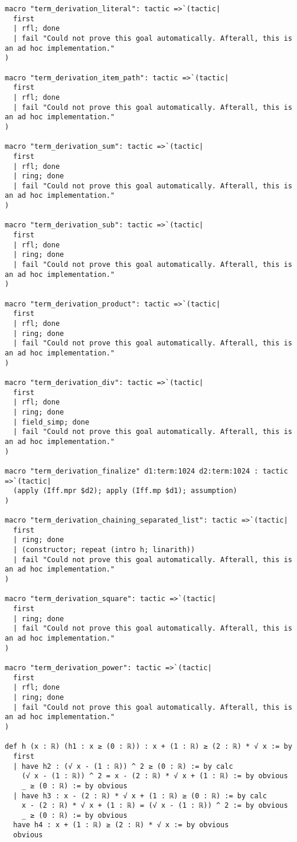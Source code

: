 \documentclass{article}
\begin{document}
\begin{tcolorbox}[colback=white!10, width=\linewidth]
\begin{lstlisting}[language=Lean4]
macro "term_derivation_literal": tactic =>`(tactic|
  first
  | rfl; done
  | fail "Could not prove this goal automatically. Afterall, this is an ad hoc implementation."
)

macro "term_derivation_item_path": tactic =>`(tactic|
  first
  | rfl; done
  | fail "Could not prove this goal automatically. Afterall, this is an ad hoc implementation."
)

macro "term_derivation_sum": tactic =>`(tactic|
  first
  | rfl; done
  | ring; done
  | fail "Could not prove this goal automatically. Afterall, this is an ad hoc implementation."
)

macro "term_derivation_sub": tactic =>`(tactic|
  first
  | rfl; done
  | ring; done
  | fail "Could not prove this goal automatically. Afterall, this is an ad hoc implementation."
)

macro "term_derivation_product": tactic =>`(tactic|
  first
  | rfl; done
  | ring; done
  | fail "Could not prove this goal automatically. Afterall, this is an ad hoc implementation."
)

macro "term_derivation_div": tactic =>`(tactic|
  first
  | rfl; done
  | ring; done
  | field_simp; done
  | fail "Could not prove this goal automatically. Afterall, this is an ad hoc implementation."
)

macro "term_derivation_finalize" d1:term:1024 d2:term:1024 : tactic =>`(tactic|
  (apply (Iff.mpr $d2); apply (Iff.mp $d1); assumption)
)

macro "term_derivation_chaining_separated_list": tactic =>`(tactic|
  first
  | ring; done
  | (constructor; repeat (intro h; linarith))
  | fail "Could not prove this goal automatically. Afterall, this is an ad hoc implementation."
)

macro "term_derivation_square": tactic =>`(tactic|
  first
  | ring; done
  | fail "Could not prove this goal automatically. Afterall, this is an ad hoc implementation."
)

macro "term_derivation_power": tactic =>`(tactic|
  first
  | rfl; done
  | ring; done
  | fail "Could not prove this goal automatically. Afterall, this is an ad hoc implementation."
)

def h (x : ℝ) (h1 : x ≥ (0 : ℝ)) : x + (1 : ℝ) ≥ (2 : ℝ) * √ x := by
  first
  | have h2 : (√ x - (1 : ℝ)) ^ 2 ≥ (0 : ℝ) := by calc
    (√ x - (1 : ℝ)) ^ 2 = x - (2 : ℝ) * √ x + (1 : ℝ) := by obvious
    _ ≥ (0 : ℝ) := by obvious
  | have h3 : x - (2 : ℝ) * √ x + (1 : ℝ) ≥ (0 : ℝ) := by calc
    x - (2 : ℝ) * √ x + (1 : ℝ) = (√ x - (1 : ℝ)) ^ 2 := by obvious
    _ ≥ (0 : ℝ) := by obvious
  have h4 : x + (1 : ℝ) ≥ (2 : ℝ) * √ x := by obvious
  obvious

\end{lstlisting}
\end{tcolorbox}
\end{document}
